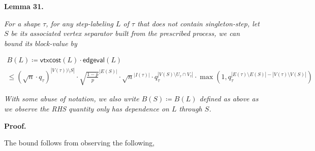 \documentclass[10pt,a4paper]{article}
\begin{document}


\par\medskip\noindent\textbf{
\textbf{Lemma 31}\textbf{.}
}\par



\emph{For a shape $\tau$, for any step-labeling $L$ of $\tau$ that does not contain singleton-step, let $S$ be its associated vertex separator built from the prescribed process, we can bound its block-value by}\par




\[\begin{gathered}
\displaystyle B(L) \displaystyle\coloneqq\mathsf{vtxcost}(L)\cdot\mathsf{edgeval}(L) \\
\displaystyle\leq(\sqrt{n}\cdot q_{\tau})^{|V(\tau))\setminus S|}\cdot\sqrt{\frac{1-p}{p}}^{|E(S)|}\cdot\sqrt{n}^{|I(\tau)|}\cdot q_{\tau}^{|V(S)\setminus
U_{\tau}\cap V_{\tau}|}\cdot\max(1,q_{\tau}^{|E(\tau)\setminus E(S)|-|V(\tau)\setminus V(S)|})
\end{gathered}\]


\emph{With some abuse of notation, we also write $B(S)\coloneqq B(L)$ defined as above as we observe the RHS quantity only has dependence on $L$ through $S$.}\par






\par\medskip\noindent\textbf{Proof.}\par




The bound follows from observing the following,\par
\end{document}
